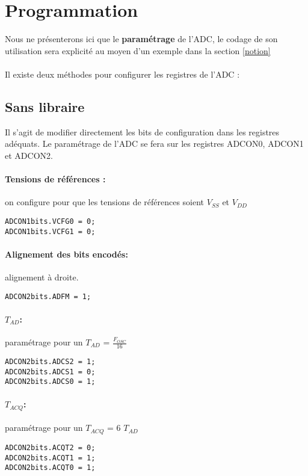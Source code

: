 \section{Programmation}
\label{programmation}
Nous ne présenterons ici que le \textbf{paramétrage} de l'ADC, le codage de son utilisation sera explicité au moyen d'un exemple dans la section \ref{notion}
\paragraph{}
Il existe deux méthodes pour configurer les registres de l'ADC :

\subsection{Sans libraire}
Il s'agit de modifier directement les bits de configuration dans les registres adéquats. Le paramétrage de l'ADC se fera sur les registres ADCON0, ADCON1 et ADCON2.

\paragraph{Tensions de références :} on configure pour que les tensions de références soient  $V_{SS}$ et $V_{DD}$


\begin{lstlisting}
ADCON1bits.VCFG0 = 0;
ADCON1bits.VCFG1 = 0;
\end{lstlisting}

\paragraph{Alignement des bits encodés:} alignement à droite.
\begin{lstlisting}
ADCON2bits.ADFM = 1;
\end{lstlisting}


\paragraph{\textbf{$T_{AD}$}:} paramétrage pour un $T_{AD}$ = $\frac{F_{OSC}}{16}$
\begin{lstlisting}
ADCON2bits.ADCS2 = 1;
ADCON2bits.ADCS1 = 0;
ADCON2bits.ADCS0 = 1;
\end{lstlisting}

\paragraph{\textbf{$T_{ACQ}$}:} paramétrage pour un $T_{ACQ}$ = 6 $T_{AD}$
\begin{lstlisting}
ADCON2bits.ACQT2 = 0;
ADCON2bits.ACQT1 = 1;
ADCON2bits.ACQT0 = 1;
\end{lstlisting}


